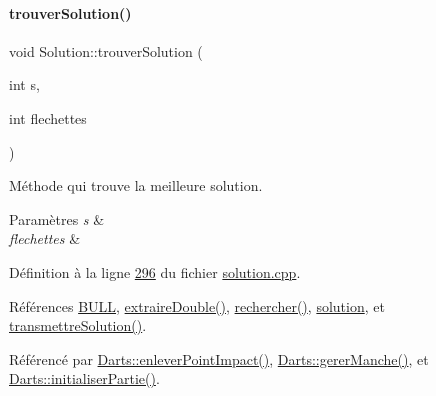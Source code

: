 \paragraph{\texorpdfstring{trouver\+Solution()}{trouverSolution()}}
{\footnotesize\ttfamily void Solution\+::trouver\+Solution (\begin{DoxyParamCaption}\item[{int}]{s,  }\item[{int}]{flechettes }\end{DoxyParamCaption})}



Méthode qui trouve la meilleure solution. 


\begin{DoxyParams}{Paramètres}
{\em s} & \\
\hline
{\em flechettes} & \\
\hline
\end{DoxyParams}


Définition à la ligne \hyperlink{solution_8cpp_source_l00296}{296} du fichier \hyperlink{solution_8cpp_source}{solution.\+cpp}.



Références \hyperlink{darts_8h_source_l00022}{B\+U\+LL}, \hyperlink{solution_8cpp_source_l00198}{extraire\+Double()}, \hyperlink{solution_8cpp_source_l00217}{rechercher()}, \hyperlink{solution_8h_source_l00039}{solution}, et \hyperlink{solution_8cpp_source_l00042}{transmettre\+Solution()}.



Référencé par \hyperlink{darts_8cpp_source_l00274}{Darts\+::enlever\+Point\+Impact()}, \hyperlink{darts_8cpp_source_l00303}{Darts\+::gerer\+Manche()}, et \hyperlink{darts_8cpp_source_l00144}{Darts\+::initialiser\+Partie()}.



